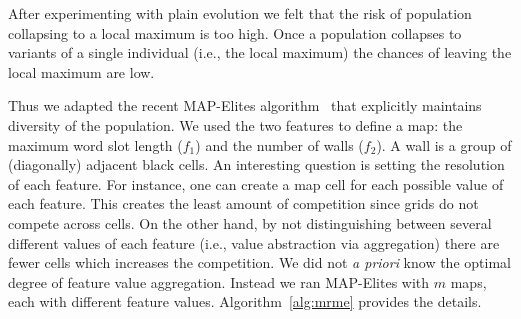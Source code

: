 After experimenting with plain evolution we felt that the risk of population collapsing to a local maximum is too high. Once a population collapses to variants of a single individual (i.e., the local maximum) the chances of leaving the local maximum are low. 

Thus we adapted the recent MAP-Elites algorithm~\cite{mapElites} that explicitly maintains diversity of the population. We used the two features to define a map: the maximum word slot length ($f_1$) and the number of walls ($f_2$). A wall is a group of (diagonally) adjacent black cells. An interesting question is setting the resolution of each feature. For instance, one can create a map cell for each possible value of each feature. This creates the least amount of competition since grids do not compete across cells. On the other hand, by not distinguishing between several different values of each feature (i.e., value abstraction via aggregation) there are fewer cells which increases the competition. We did not {\em a priori} know the optimal degree of feature value aggregation. Instead we ran MAP-Elites with $m$ maps, each with different feature values. Algorithm~\ref{alg:mrme} provides the details. 

